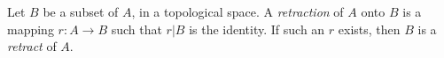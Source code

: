 Let $B$ be a subset of $A$, in a topological space. A \textit{retraction} of $A$ onto $B$ is a mapping $r: A \to B$ such that $r|B$ is the identity. If such an $r$ exists, then $B$ is a \textit{retract} of $A$.

